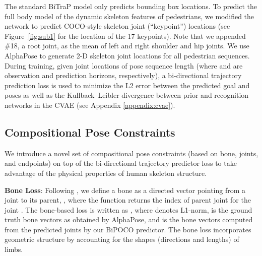 \documentclass[nohyperref]{article}
\theoremstyle{plain}
\theoremstyle{definition}
\theoremstyle{remark}
\begin{document}
\vspace{-1mm}
The standard BiTraP model only predicts bounding box locations. To predict the full body model of the dynamic skeleton features of pedestrians, we modified the network to predict COCO-style skeleton joint (``keypoint'') locations (see Figure~\ref{fig:sub1} for the location of the 17 keypoints). Note that we appended \#18, a root joint, as the mean of left and right shoulder and hip joints. We use AlphaPose \cite{fang2017rmpe, xiu2018poseflow} to generate 2-D skeleton joint locations for all pedestrian sequences. During training, given joint locations of pose sequence length  (where  and  are observation and prediction horizons, respectively), a bi-directional trajectory prediction loss  is used to minimize the L2 error between the predicted goal and poses as well as the Kullback–Leibler divergence  between prior and recognition networks in the CVAE  (see Appendix \ref{appendix:cvae}).

























\vspace{-3mm}
\subsection{Compositional Pose Constraints}
\label{sec:posecons}
\vspace{-2mm}
We introduce a novel set of  compositional pose constraints (based on bone, joints, and endpoints) on top of the bi-directional trajectory predictor loss to take advantage of the physical properties of human skeleton structure. 

\vspace{-1mm}


\textbf{Bone Loss}: Following \cite{sun2017compositional}, we define a bone as a directed vector pointing from a joint to its parent, , where the function  returns the index of parent joint for the  joint .  The bone-based loss is written as ,
where  denotes L1-norm,  is the ground truth bone vectors as obtained by AlphaPose, and   is the bone vectors computed from the predicted joints by our BiPOCO predictor. The bone loss incorporates geometric structure by accounting for the shapes (directions and lengths) of limbs.
\end{document}
